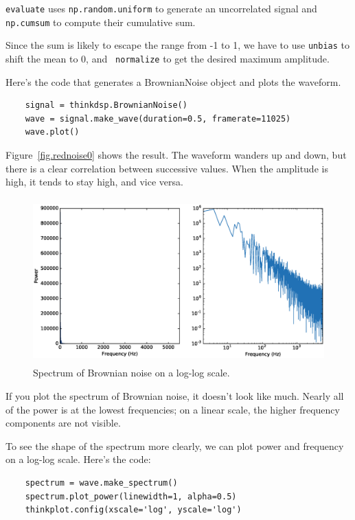 \documentclass[12pt]{book}
\begin{document}
{\tt evaluate} uses {\tt np.random.uniform} to generate an
uncorrelated signal and {\tt np.cumsum} to compute their cumulative
sum.

Since the sum is likely to escape the range from -1 to
1, we have to use {\tt unbias} to shift the mean to 0, and {\tt
  normalize} to get the desired maximum amplitude.

Here's the code that generates a BrownianNoise object and plots the
waveform.

\begin{verbatim}
    signal = thinkdsp.BrownianNoise()
    wave = signal.make_wave(duration=0.5, framerate=11025)
    wave.plot()
\end{verbatim}

Figure~\ref{fig.rednoise0} shows the result.  The waveform
wanders up and down, but there is a clear correlation between
successive values.  When the amplitude is high, it tends to stay
high, and vice versa.

\begin{figure}
\centerline{\includegraphics[height=2.5in]{figs/rednoise3.eps}}
\caption{Spectrum of Brownian noise on a log-log scale.}
\label{fig.rednoise3}
\end{figure}

If you plot the spectrum of Brownian noise, it doesn't look like
much.  Nearly all of the power is at the lowest frequencies; on a
linear scale, the higher frequency components are not visible.

To see the shape of the spectrum more clearly, we can plot power
and frequency on a log-log scale.  Here's the code:

\begin{verbatim}
    spectrum = wave.make_spectrum()
    spectrum.plot_power(linewidth=1, alpha=0.5)
    thinkplot.config(xscale='log', yscale='log')
\end{verbatim}
\end{document}
